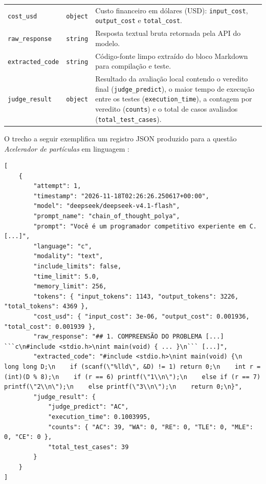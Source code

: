 \begin{table}[!htbp]
{\begin{tabular}{@{}llp{9.4cm}@{}}
\texttt{cost\_usd}        & \texttt{object} & \raggedright\arraybackslash Custo financeiro em dólares (USD): \texttt{input\_cost}, \texttt{output\_cost} e \texttt{total\_cost}. \\
\texttt{raw\_response}    & \texttt{string} & \raggedright\arraybackslash Resposta textual bruta retornada pela API do modelo. \\
\texttt{extracted\_code}  & \texttt{string} & \raggedright\arraybackslash Código-fonte limpo extraído do bloco Markdown para compilação e teste. \\
\texttt{judge\_result}    & \texttt{object} & \raggedright\arraybackslash Resultado da avaliação local contendo o veredito final (\texttt{judge\_predict}), o maior tempo de execução entre os testes (\texttt{execution\_time}), a contagem por veredito (\texttt{counts}) e o total de casos avaliados (\texttt{total\_test\_cases}). \\
\bottomrule
\end{tabular}%
}
\end{table}
\FloatBarrier

O trecho a seguir exemplifica um registro JSON produzido para a questão \textit{Acelerador de partículas} em linguagem :

\begin{small}
\begin{Verbatim}[samepage=true, breaklines, breakanywhere, fontsize=\footnotesize, frame=single, framesep=2mm, rulecolor=\color{black!40}]
[
    {
        "attempt": 1,
        "timestamp": "2026-11-18T02:26:26.250617+00:00",
        "model": "deepseek/deepseek-v4.1-flash",
        "prompt_name": "chain_of_thought_polya",
        "prompt": "Você é um programador competitivo experiente em C. [...]",
        "language": "c",
        "modality": "text",
        "include_limits": false,
        "time_limit": 5.0,
        "memory_limit": 256,
        "tokens": { "input_tokens": 1143, "output_tokens": 3226, "total_tokens": 4369 },
        "cost_usd": { "input_cost": 3e-06, "output_cost": 0.001936, "total_cost": 0.001939 },
        "raw_response": "## 1. COMPREENSÃO DO PROBLEMA [...] ```c\n#include <stdio.h>\nint main(void) { ... }\n``` [...]",
        "extracted_code": "#include <stdio.h>\nint main(void) {\n    long long D;\n    if (scanf(\"%lld\", &D) != 1) return 0;\n    int r = (int)(D % 8);\n    if (r == 6) printf(\"1\\n\");\n    else if (r == 7) printf(\"2\\n\");\n    else printf(\"3\\n\");\n    return 0;\n}",
        "judge_result": {
            "judge_predict": "AC",
            "execution_time": 0.1003995,
            "counts": { "AC": 39, "WA": 0, "RE": 0, "TLE": 0, "MLE": 0, "CE": 0 },
            "total_test_cases": 39
        }
    }
]
\end{Verbatim}
\end{small}

